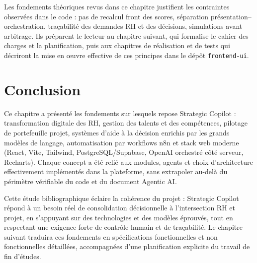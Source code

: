 Les fondements théoriques revus dans ce chapitre justifient les contraintes observées dans le code : pas de recalcul front des scores, séparation présentation--orchestration, traçabilité des demandes RH et des décisions, simulations avant arbitrage. Ils préparent le lecteur au chapitre suivant, qui formalise le cahier des charges et la planification, puis aux chapitres de réalisation et de tests qui décriront la mise en œuvre effective de ces principes dans le dépôt \texttt{frontend-ui}.

\section{Conclusion}

Ce chapitre a présenté les fondements sur lesquels repose Strategic Copilot : transformation digitale des RH, gestion des talents et des compétences, pilotage de portefeuille projet, systèmes d'aide à la décision enrichis par les grands modèles de langage, automatisation par workflows n8n et stack web moderne (React, Vite, Tailwind, PostgreSQL/Supabase, OpenAI orchestré côté serveur, Recharts). Chaque concept a été relié aux modules, agents et choix d'architecture effectivement implémentés dans la plateforme, sans extrapoler au-delà du périmètre vérifiable du code et du document Agentic AI.

Cette étude bibliographique éclaire la cohérence du projet : Strategic Copilot répond à un besoin réel de consolidation décisionnelle à l'intersection RH et projet, en s'appuyant sur des technologies et des modèles éprouvés, tout en respectant une exigence forte de contrôle humain et de traçabilité. Le chapitre suivant traduira ces fondements en spécifications fonctionnelles et non fonctionnelles détaillées, accompagnées d'une planification explicite du travail de fin d'études.
